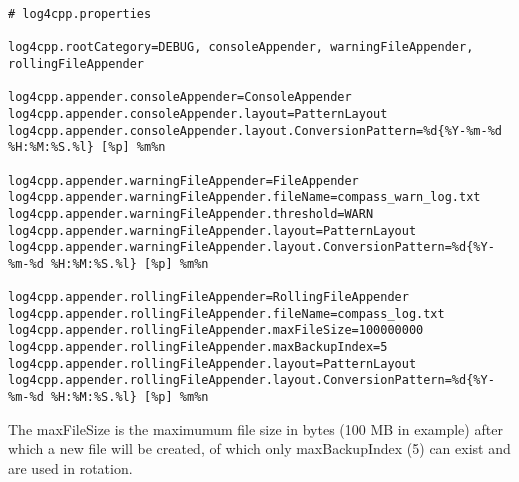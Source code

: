 \begin{lstlisting}
# log4cpp.properties

log4cpp.rootCategory=DEBUG, consoleAppender, warningFileAppender, rollingFileAppender

log4cpp.appender.consoleAppender=ConsoleAppender
log4cpp.appender.consoleAppender.layout=PatternLayout
log4cpp.appender.consoleAppender.layout.ConversionPattern=%d{%Y-%m-%d %H:%M:%S.%l} [%p] %m%n

log4cpp.appender.warningFileAppender=FileAppender
log4cpp.appender.warningFileAppender.fileName=compass_warn_log.txt
log4cpp.appender.warningFileAppender.threshold=WARN
log4cpp.appender.warningFileAppender.layout=PatternLayout
log4cpp.appender.warningFileAppender.layout.ConversionPattern=%d{%Y-%m-%d %H:%M:%S.%l} [%p] %m%n

log4cpp.appender.rollingFileAppender=RollingFileAppender
log4cpp.appender.rollingFileAppender.fileName=compass_log.txt
log4cpp.appender.rollingFileAppender.maxFileSize=100000000
log4cpp.appender.rollingFileAppender.maxBackupIndex=5
log4cpp.appender.rollingFileAppender.layout=PatternLayout
log4cpp.appender.rollingFileAppender.layout.ConversionPattern=%d{%Y-%m-%d %H:%M:%S.%l} [%p] %m%n
\end{lstlisting}

The maxFileSize is the maximumum file size in bytes (100 MB in example) after which a new file will be created, of which only maxBackupIndex (5) can exist and are used in rotation.
